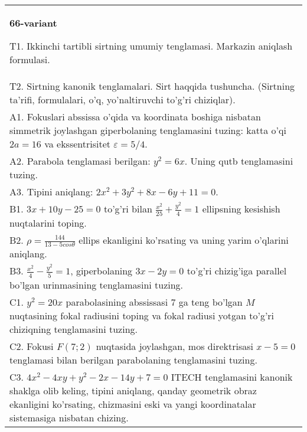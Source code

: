 \documentclass{article}
\begin{document}
\begin{tabular}{m{17cm}}
\textbf{66-variant}
\newline

T1. Ikkinchi tartibli sirtning umumiy tenglamasi. Markazin aniqlash formulasi.\\

T2. Sirtning kanonik tenglamalari. Sirt haqqida tushuncha. (Sirtning ta'rifi, formulalari, o'q, yo'naltiruvchi to'g'ri chiziqlar).\\

A1. Fokuslari abssissa o'qida va koordinata boshiga nisbatan simmetrik joylashgan giperbolaning tenglamasini tuzing: katta o'qi $2a=16$ va ekssentrisitet $\varepsilon=5/4$.\\

A2. Parabola tenglamasi berilgan: $y^2=6x$. Uning qutb tenglamasini tuzing.\\

A3. Tipini aniqlang: $2x^{2}+3y^{2}+8x-6y+11=0$.\\

B1. $3x + 10y - 25 = 0$ to'g'ri bilan $\frac{x^{2}}{25} + \frac{y^{2}}{4} = 1$ ellipsning kesishish nuqtalarini toping.  \\

B2. $\rho = \frac{144}{13 - 5cos\theta}$ ellips ekanligini ko'rsating va uning yarim o'qlarini aniqlang.\\

B3. $\frac{x^{2}}{4} - \frac{y^{2}}{5} = 1$, giperbolaning $3x - 2y = 0$ to'g'ri chizig'iga parallel bo'lgan urinmasining tenglamasini tuzing.  \\

C1. $y^{2} = 20x$ parabolasining abssissasi 7 ga teng bo'lgan $M$ nuqtasining fokal radiusini toping va fokal radiusi yotgan to'g'ri chiziqning tenglamasini tuzing.  \\

C2. Fokusi $F(7;2)$ nuqtasida joylashgan, mos direktrisasi $x - 5 = 0$ tenglamasi bilan berilgan parabolaning tenglamasini tuzing.  \\

C3. $4x^{2} - 4xy + y^{2} - 2x - 14y + 7 = 0$ ITECH tenglamasini kanonik shaklga olib keling, tipini aniqlang, qanday geometrik obraz ekanligini ko'rsating, chizmasini eski va yangi koordinatalar sistemasiga nisbatan chizing.  \\

\end{tabular}
\vspace{1cm}
\end{document}
